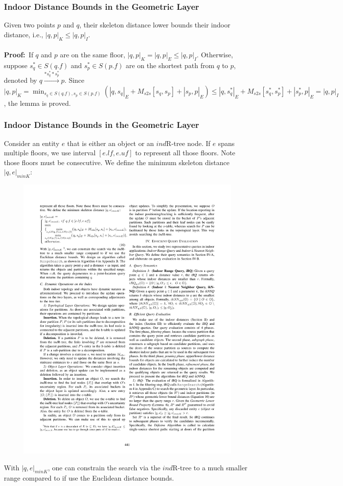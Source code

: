 \begin{frame}
\frametitle{Indoor Distance Bounds in the Geometric Layer}

\begin{lemma}
  Given two points $p$ and $q$, their skeleton distance lower bounds their indoor distance, i.e., $|q,p|_K \leq |q,p|_I$.\\~\\
  \textbf{Proof:}~If $q$ and $p$ are on the same floor, $|q,p|_K = |q,p|_E \leq |q,p|_I$. Otherwise, suppose $s_{q}^{*} \in S(q.f)$ and $s_{p}^{*} \in S(p.f)$ are on the shortest path from $q$ to $p$, denoted by $q \overset{*s_{q}^{*}*s_{p}^{*}}{\rightarrow} p$. Since $|q,p|_K = \min_{s_q \in S(q.f), s_p \in S(p.f)}(|q,s_q|_E + M_{s2s}[s_q,s_p] + |s_p, p|_E) \leq |q,s_{q}^{*}|_E + M_{s2s}[s_{q}^{*},s_{p}^{*}] + |s_{p}^{*}, p|_E = |q,p|_I$, the lemma is proved.
\end{lemma}

\end{frame}


\begin{frame}
\frametitle{Indoor Distance Bounds in the Geometric Layer}

Consider an entity $e$ that is either an object or an $ind$R-tree node. If $e$ spans multiple floors, we use interval $[e.lf,e.uf]$ to represent all those floors. Note those floors must be consecutive. We define the minimum skeleton distance $|q,e|_{minK}$:

\begin{figure}[tb]
  \includegraphics[width=0.7\columnwidth]{figures/2-6/2-6-12.pdf}
\end{figure}

With $|q,e|_{minK}$, one can constrain the search via the $ind$R-tree to a much smaller range compared to if use the Euclidean distance bounds.

\end{frame}

